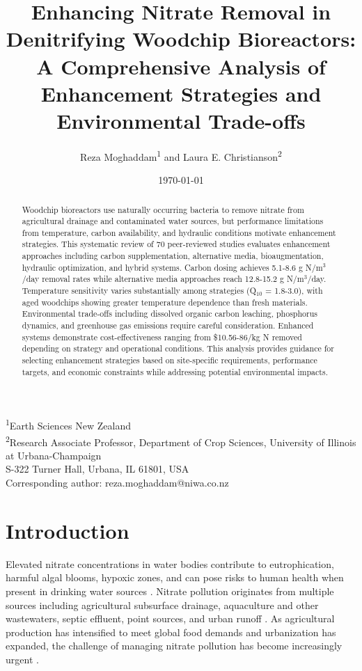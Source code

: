 \documentclass[12pt,a4paper]{article}
\title{Enhancing Nitrate Removal in Denitrifying Woodchip Bioreactors: A Comprehensive Analysis of Enhancement Strategies and Environmental Trade-offs}
\author{Reza Moghaddam\textsuperscript{1} and Laura E. Christianson\textsuperscript{2}}
\date{\today}
\begin{document}
\maketitle

\begin{center}
\footnotesize
\textsuperscript{1}Earth Sciences New Zealand\\
\textsuperscript{2}Research Associate Professor, Department of Crop Sciences, University of Illinois at Urbana-Champaign\\
S-322 Turner Hall, Urbana, IL 61801, USA\\
Corresponding author: reza.moghaddam@niwa.co.nz
\end{center}

\begin{abstract}
Woodchip bioreactors use naturally occurring bacteria to remove nitrate from agricultural drainage and contaminated water sources, but performance limitations from temperature, carbon availability, and hydraulic conditions motivate enhancement strategies. This systematic review of 70 peer-reviewed studies evaluates enhancement approaches including carbon supplementation, alternative media, bioaugmentation, hydraulic optimization, and hybrid systems. Carbon dosing achieves 5.1-8.6 g N/m$^3$/day removal rates while alternative media approaches reach 12.8-15.2 g N/m$^3$/day. Temperature sensitivity varies substantially among strategies (Q$_{10}$ = 1.8-3.0), with aged woodchips showing greater temperature dependence than fresh materials. Environmental trade-offs including dissolved organic carbon leaching, phosphorus dynamics, and greenhouse gas emissions require careful consideration. Enhanced systems demonstrate cost-effectiveness ranging from \$10.56-86/kg N removed depending on strategy and operational conditions. This analysis provides guidance for selecting enhancement strategies based on site-specific requirements, performance targets, and economic constraints while addressing potential environmental impacts.
\end{abstract}

\section{Introduction}

Elevated nitrate concentrations in water bodies contribute to eutrophication, harmful algal blooms, hypoxic zones, and can pose risks to human health when present in drinking water sources \citep{RN1181}. Nitrate pollution originates from multiple sources including agricultural subsurface drainage, aquaculture and other wastewaters, septic effluent, point sources, and urban runoff \citep{RN1181, RN310}. As agricultural production has intensified to meet global food demands and urbanization has expanded, the challenge of managing nitrate pollution has become increasingly urgent \citep{RN312}.
\end{document}
